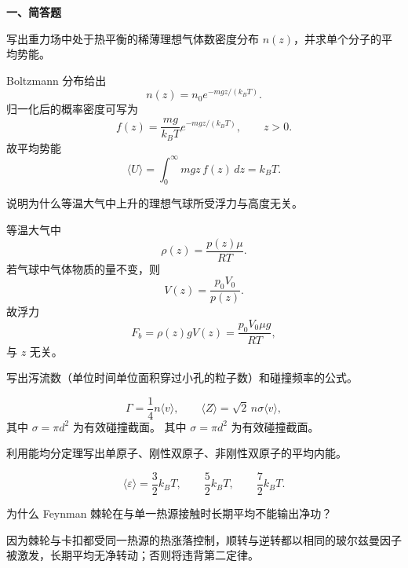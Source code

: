 ﻿


\textbf{一、简答题}
\begin{question}
写出重力场中处于热平衡的稀薄理想气体数密度分布 $n(z)$，并求单个分子的平均势能。
\begin{solution}

Boltzmann 分布给出
\[
 n(z)=n_0 e^{-mgz/(k_BT)}.
\]
归一化后的概率密度可写为
\[
 f(z)=\frac{mg}{k_BT}e^{-mgz/(k_BT)},\qquad z>0.
\]
故平均势能
\[
\langle U\rangle=\int_0^{\infty}mgz\,f(z)\,dz=k_BT.
\]
\end{solution}
\end{question}

\begin{question}
说明为什么等温大气中上升的理想气球所受浮力与高度无关。
\begin{solution}

等温大气中
\[
\rho(z)=\frac{p(z)\mu}{RT}.
\]
若气球中气体物质的量不变，则
\[
V(z)=\frac{p_0V_0}{p(z)}.
\]
故浮力
\[
F_b=\rho(z)gV(z)=\frac{p_0V_0\mu g}{RT},
\]
与 $z$ 无关。
\end{solution}
\end{question}

\begin{question}
写出泻流数（单位时间单位面积穿过小孔的粒子数）和碰撞频率的公式。
\begin{solution}

\[
\Gamma=\frac14 n\langle v\rangle,
\qquad
\langle Z\rangle=\sqrt2\,n\sigma\langle v\rangle,
\]
其中 $\sigma=\pi d^2$ 为有效碰撞截面。
其中 $\sigma=\pi d^2$ 为有效碰撞截面。
\end{solution}
\end{question}

\begin{question}
利用能均分定理写出单原子、刚性双原子、非刚性双原子的平均内能。
\begin{solution}

\[
\langle\varepsilon\rangle=\frac32k_BT,\qquad \frac52k_BT,\qquad \frac72k_BT.
\]
\end{solution}
\end{question}

\begin{question}
为什么 Feynman 棘轮在与单一热源接触时长期平均不能输出净功？
\begin{solution}

因为棘轮与卡扣都受同一热源的热涨落控制，顺转与逆转都以相同的玻尔兹曼因子被激发，长期平均无净转动；否则将违背第二定律。

\end{solution}
\end{question}

